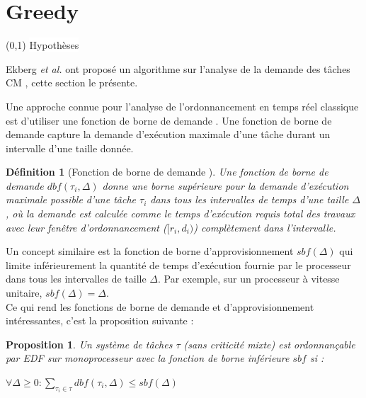 \documentclass[12pt,a4paper,oneside]{book}
\theoremstyle{break}
\newtheorem{defin}{Définition}[chapter]
\theoremstyle{breakplain}
\newtheorem{prop}{Proposition}[chapter]
\begin{document}
\section{Greedy}
\begin{center}
\boxput*(0,1){
\colorbox{white}{Hypothèses}
}{
\setlength{\fboxsep}{6pt}
}

\end{center}
Ekberg \textit{et al.} ont proposé un algorithme sur l'analyse de la demande des tâches CM \cite{ekberg2012outstanding}, cette section le présente.\\

\pagebreak

Une approche connue pour l'analyse de l'ordonnancement en temps réel classique est d'utiliser une fonction de borne de demande \cite{baruah1990preemptively}. Une fonction de borne de demande capture la demande d'exécution maximale d'une tâche durant un intervalle d'une taille donnée.\\

\begin{defin}[Fonction de borne de demande \cite{ekberg2012outstanding}]
Une fonction de borne de demande $dbf(\tau_i, \Delta)$ donne une borne supérieure pour la demande d'exécution maximale possible d'une tâche $\tau_i$ dans tous les intervalles de temps d'une taille $\Delta$, où la demande est calculée comme le temps d'exécution requis total des travaux avec leur fenêtre d'ordonnancement ($[r_i, d_i)$) complètement dans l'intervalle.
\end{defin}

Un concept similaire est la fonction de borne d'approvisionnement $sbf(\Delta)$ qui limite inférieurement la quantité de temps d'exécution fournie par le processeur dans tous les intervalles de taille $\Delta$. Par exemple, sur un processeur à vitesse unitaire, $sbf(\Delta) = \Delta$.\\

Ce qui rend les fonctions de borne de demande et d'approvisionnement intéressantes, c'est la proposition suivante :

\begin{prop}
\label{greedy:class:dbfsbf}
Un système de tâches $\tau$ (sans criticité mixte) est ordonnançable par \textit{EDF} sur monoprocesseur avec la fonction de borne inférieure $sbf$ si :
\begin{center}
$ \forall \Delta \ge 0 : \underset{\tau_i \in \tau}{\sum}dbf(\tau_i, \Delta) \le sbf(\Delta)$
\end{center}
\end{prop}
\end{document}
